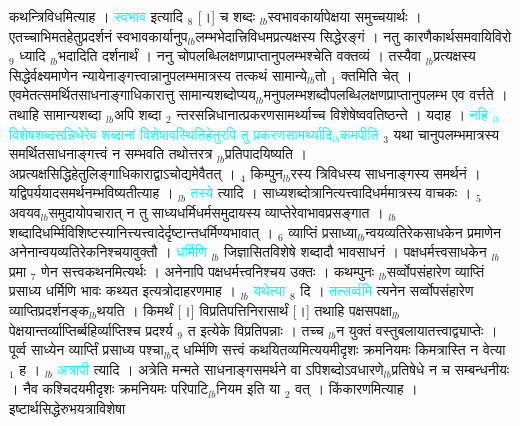\documentclass[article,12pt,a4paper]{memoir}%
\newcommand{\quotelemma}[1]{\textcolor{cyan}{#1}}
\begin{document}
	  
	  \pstart \leavevmode%
	\hphantom{.}कथन्त्रिविधमित्याह । \quotelemma{स्वभाव} \cite[1b2]{vn-msN} इत्यादि {\tiny $_{8}$} [।] च शब्दः {\tiny $_{lb}$}स्वभावकार्यापेक्षया समुच्चयार्थः । एतच्चाभिमतहेतुप्रदर्शनं स्वभावकार्यानुप{\tiny $_{lb}$}लम्भभेदात्त्रिविधमप्रत्यक्षस्य सिद्धेरङ्गं । नतु कारणैकार्थसमवायिविरो {\tiny $_{9}$}\leavevmode{} ध्यादि {\tiny $_{lb}$}भदादिति दर्शनार्थं । ननु चोपलब्धिलक्षणप्राप्तानुपलम्भश्चेति वक्तव्यं । तस्यैवा {\tiny $_{lb}$}प्रत्यक्षस्य सिद्धेर्वक्ष्यमाणेन न्यायेनाङ्गत्त्वान्नानुपलम्भमात्रस्य तत्कथं सामान्ये{\tiny $_{lb}$}तो {\tiny $_{1}$} क्तमिति चेत् । एवमेतत्समर्थितसाधनाङ्गाधिकारात्तु सामान्यशब्दोप्यय{\tiny $_{lb}$}मनुपलम्भशब्दौपलब्धिलक्षणप्राप्तानुपलम्भ एव वर्त्तते । तथाहि सामान्यशब्दा {\tiny $_{lb}$}अपि शब्दा {\tiny $_{2}$} न्तरसन्निधानात्प्रकरणसामर्थ्याच्च विशेषेष्ववतिष्ठन्ते । यदाह । \quotelemma{नहि {\tiny $_{lb}$}विशेषशब्दसन्निधेरेव शब्दानां विशेषावस्थितिहेतुरपि तु प्रकरणसामर्थ्यादि{\tiny $_{lb}$}कमपीति} {\tiny $_{3}$} यथा चानुपलम्भमात्रस्य समर्थितसाधनाङ्गत्त्वं न सम्भवति तथोत्तरत्र {\tiny $_{lb}$}प्रतिपादयिष्यति । अप्रत्यक्षसिद्धिहेतुलिङ्गाधिकाराद्वाऽचोद्यमेवैतत् । {\tiny $_{4}$} किम्पुन{\tiny $_{lb}$}रस्य त्रिविधस्य साधनाङ्गस्य समर्थनं । यद्विपर्ययादसमर्थनम्भविष्यतीत्याह । {\tiny $_{lb}$} \quotelemma{तस्ये} \cite[1b3]{vn-msN} त्यादि । साध्यशब्दोत्रानित्यत्त्वादिधर्ममात्रस्य वाचकः । {\tiny $_{5}$} अवयव{\tiny $_{lb}$}समुदायोपचारात् न तु साध्यधर्मिधर्मसमुदायस्य व्याप्तेरेवाभावप्रसङ्गात । {\tiny $_{lb}$}शब्दादिधर्म्मिविशिष्टस्यानित्त्यत्त्वादेर्दृष्टान्तधर्मिण्यभावात् । {\tiny $_{6}$} व्याप्तिं प्रसाध्या{\tiny $_{lb}$}न्वयव्यतिरेकसाधकेन प्रमाणेन अनेनान्वयव्यतिरेकनिश्चयावुक्तौ । \quotelemma{धर्मिणि} {\tiny $_{lb}$} \cite[1b3]{vn-msN} जिज्ञासितविशेषे शब्दादौ भावसाधनं \cite[1b2]{vn-msN} । पक्षधर्मत्त्वसाधकेन {\tiny $_{lb}$}प्रमा {\tiny $_{7}$} णेन सत्त्वकथनमित्यर्थः । अनेनापि पक्षधर्मत्त्वनिश्चय उक्तः । कथम्पुनः {\tiny $_{lb}$}सर्व्वोपसंहारेण व्याप्तिं प्रसाध्य धर्मिणि भावः कथ्यत इत्यत्रोदाहरणमाह । {\tiny $_{lb}$} \quotelemma{यथेत्या} \cite[1b3]{vn-msN} {\tiny $_{8}$} दि । \quotelemma{तत्सर्व्वमि} त्यनेन सर्व्वोपसंहारेण व्याप्तिप्रदर्शनङ्क{\tiny $_{lb}$}थयति । किमर्थं [।] विप्रतिपत्तिनिरासार्थं [।] तथाहि पक्षसपक्षा{\tiny $_{lb}$} \leavevmode{} पेक्षयान्तर्व्याप्तिर्ब्बहिर्व्याप्तिश्च प्रदर्श्य {\tiny $_{9}$}\leavevmode{} त इत्येके विप्रतिपन्नाः । तच्च {\tiny $_{lb}$}न युक्तं वस्तुबलायातत्त्वाद्व्याप्तेः । पूर्व्व साध्येन व्यार्प्तिं प्रसाध्य पश्चा{\tiny $_{lb}$}द् धर्म्मिणि सत्त्वं कथयितव्यमित्ययमीदृशः क्रमनियमः किमत्रास्ति न वेत्या {\tiny $_{1}$} ह । {\tiny $_{lb}$} \quotelemma{अत्रापी} \cite[1b3]{vn-msN} त्यादि । अत्रेति मन्मते साधनाङ्गसमर्थने वा ऽपिशब्दोऽवधारणे{\tiny $_{lb}$}प्रतिषेधे न च सम्बन्धनीयः । नैव कश्चिदयमीदृशः क्रमनियमः \cite[1b3]{vn-msN} परिपाटि{\tiny $_{lb}$}नियम इति या {\tiny $_{2}$} वत् । किंकारणमित्याह । इष्टार्थसिद्धेरुभयत्राविशेषा 
\end{document}
